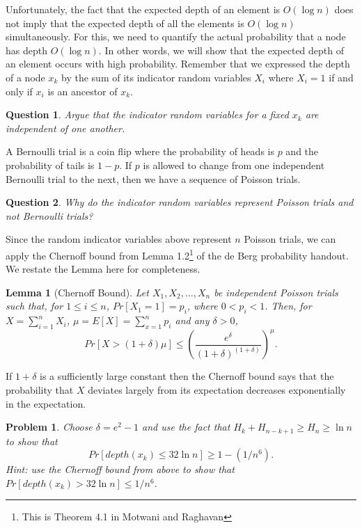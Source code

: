 \documentclass[11pt]{article}
\newtheorem{lemma}{Lemma}
\newtheorem{question}{Question}
\newtheorem{problem}{Problem}
\begin{document}
Unfortunately, the fact that the expected depth of an element is $O(\log n)$ does not imply that the expected depth of all the elements is $O(\log n)$ simultaneously.  For this, we need to quantify the actual probability that a node has depth $O(\log n)$.  In other words, we will show that the expected depth of an element occurs with high probability.  Remember that we expressed the depth of a node $x_{k}$ by the sum of its indicator random variables $X_{i}$ where $X_{i}=1$ if and only if $x_{i}$ is an ancestor of $x_{k}$.  

\begin{question}
Argue that the indicator random variables for a fixed $x_{k}$ are independent of one another.
\end{question}

A Bernoulli trial is a coin flip where the probability of heads is $p$ and the probability of tails is $1-p$.  If $p$ is allowed to change from one independent Bernoulli trial to the next, then we have a sequence of Poisson trials.  

\begin{question}
Why do the indicator random variables represent Poisson trials and not Bernoulli trials?
\end{question}

\noindent Since the random indicator variables above represent $n$ Poisson trials, we can apply the Chernoff bound from Lemma 1.2\footnote{This is Theorem 4.1 in Motwani and Raghavan} of the de Berg probability handout.  We restate the Lemma here for completeness.

\begin{lemma}[Chernoff Bound]
Let $X_{1}, X_{2}, \ldots, X_{n}$ be independent Poisson trials such that, for $1 \leq i \leq n$, $Pr[X_{1}=1] = p_{i}$, where $0 < p_{i} < 1$.  Then, for $X = \sum_{i=1}^{n} X_{i}$, $\mu = E[X] = \sum_{x=1}^{n} p_{i}$ and any $\delta > 0$,
\[
Pr[X > (1+\delta)\mu] \leq \left( \frac{e^{\delta}}{(1+\delta)^{(1+\delta)}} \right)^{\mu}.
\]
\end{lemma}

\noindent If $1+\delta$ is a sufficiently large constant then the Chernoff bound says that the probability that $X$ deviates largely from its expectation decreases exponentially in the expectation. 

\begin{problem}
Choose $\delta=e^{2}-1$ and use the fact that $H_{k} + H_{n-k+1} \geq H_{n} \geq \ln n$ to show that 
\[
Pr[depth(x_{k}) \leq 32 \ln n] \geq 1-(1/n^{6}).
\]
Hint:  use the Chernoff bound from above to show that $Pr[depth(x_{k}) > 32 \ln n] \leq 1/n^{6}$.
\end{problem}
\end{document}
